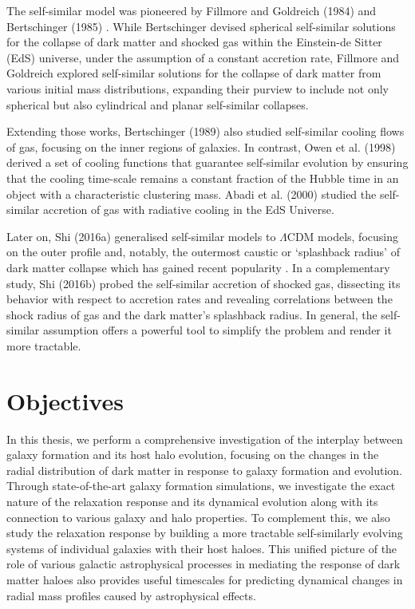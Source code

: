 The self-similar model was pioneered by Fillmore and Goldreich (1984) \cite{1984FillmoreGoldreich} and Bertschinger (1985) \cite{1985Bertschinger}. While Bertschinger devised spherical self-similar solutions for the collapse of dark matter and shocked gas within the Einstein-de Sitter (EdS) universe, under the assumption of a constant accretion rate, Fillmore and Goldreich explored self-similar solutions for the collapse of dark matter from various initial mass distributions, expanding their purview to include not only spherical but also cylindrical and planar self-similar collapses. 

Extending those works, Bertschinger (1989) \citep{1989Bertschinger} also studied self-similar cooling flows of gas, focusing on the inner regions of galaxies. In contrast, Owen et al. (1998) \citep{1998OwenWeinberg_etal} derived a set of cooling functions that guarantee self-similar evolution by ensuring that the cooling time-scale remains a constant fraction of the Hubble time in an object with a characteristic clustering mass. Abadi et al. (2000) \citep{2000Abadi_etal_SelfSimCool} studied the self-similar accretion of gas with radiative cooling in the EdS Universe.

Later on, Shi (2016a) \cite{2016ShiDMLamCDM} generalised self-similar models to $\Lambda$CDM models, focusing on the outer profile and, notably, the outermost caustic or `splashback radius' of dark matter collapse which has gained recent popularity \cite{2014DiemerKrastov,2014AdhikariDalalChamberlain,2018Changetal_DES_splashback}.
In a complementary study, Shi (2016b) \cite{2016ShiICM} probed the self-similar accretion of shocked gas, dissecting its behavior with respect to accretion rates and revealing correlations between the shock radius of gas and the dark matter's splashback radius. In general, the self-similar assumption offers a powerful tool to simplify the problem and render it more tractable.



\section{Objectives}

In this thesis, we perform a comprehensive investigation of the interplay between galaxy formation and its host halo evolution, focusing on the changes in the radial distribution of dark matter in response to galaxy formation and evolution. Through state-of-the-art galaxy formation simulations, we investigate the exact nature of the relaxation response and its dynamical evolution along with its connection to various galaxy and halo properties. To complement this, we also study the relaxation response by building a more tractable self-similarly evolving systems of individual galaxies with their host haloes. This unified picture of the role of various galactic astrophysical processes in mediating the response of dark matter haloes also provides useful timescales for predicting dynamical changes in radial mass profiles caused by astrophysical effects.

